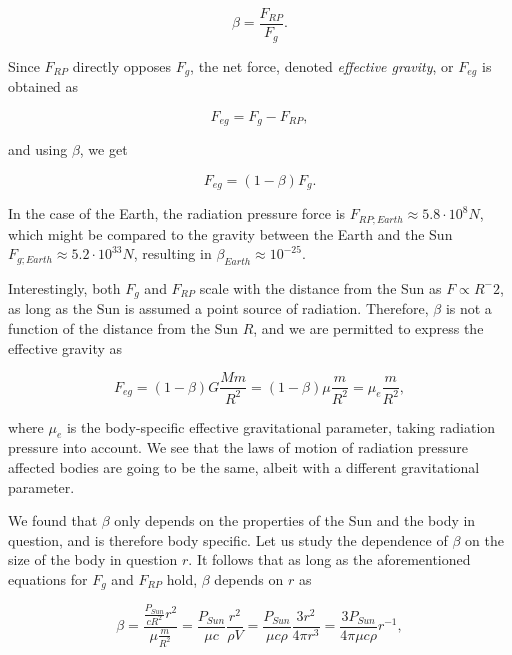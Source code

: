 \begin{equation}
    \beta = \frac{F_{RP}}{F_g}.
\end{equation}

Since $F_{RP}$ directly opposes $F_g$, the net force, denoted \textit{effective gravity}, or $F_{eg}$ is obtained as

\begin{equation}
    F_{eg} = F_g - F_{RP},
\end{equation}

and using $\beta$, we get

\begin{equation}
    F_{eg} = (1-\beta) F_g.
\end{equation}

In the case of the Earth, the radiation pressure force is $F_{RP;Earth} \approx 5.8 \cdot 10^8 \si{N}$, which might be compared to the gravity between the Earth and the Sun $F_{g;Earth} \approx 5.2 \cdot 10^{33} \si{N}$, resulting in $\beta_{Earth} \approx 10^{-25}$. 

Interestingly, both $F_g$ and $F_{RP}$ scale with the distance from the Sun as $F \propto {R^-2}$, as long as the Sun is assumed a point source of radiation. Therefore, $\beta$ is not a function of the distance from the Sun $R$, and we are permitted to express the effective gravity as 

\begin{equation}
    F_{eg} = (1-\beta) G \frac{M m}{R^2} = (1-\beta) \mu \frac{m}{R^2} = \mu_{e} \frac{m}{R^2},
\end{equation}

where $\mu_{e}$ is the body-specific effective gravitational parameter, taking radiation pressure into account. We see that the laws of motion of radiation pressure affected bodies are going to be the same, albeit with a different gravitational parameter. 

We found that $\beta$ only depends on the properties of the Sun and the body in question, and is therefore body specific. Let us study the dependence of $\beta$ on the size of the body in question $r$. It follows that as long as the aforementioned equations for $F_{g}$ and $F_{RP}$ hold, $\beta$ depends on $r$ as 

\begin{equation} 
    \beta = \frac{\frac{P_{Sun}}{c R^2} r^2}{\mu \frac{m}{R^2}} = \frac{P_{Sun}}{\mu c} \frac{r^2}{\rho V} = \frac{P_{Sun}}{\mu c \rho} \frac{3 r^2}{4 \pi r^3} = \frac{3 P_{Sun}}{4 \pi \mu c \rho} r^{-1},
\end{equation}

